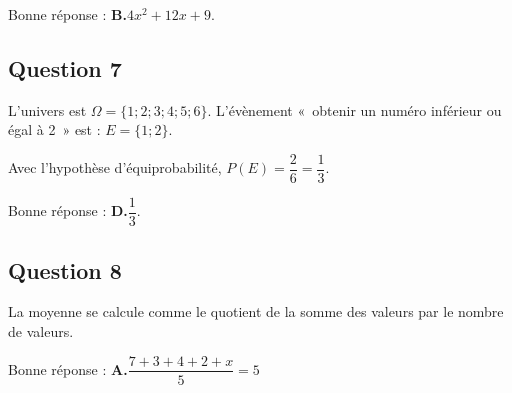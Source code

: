 \documentclass[10pt]{article}
\begin{document}
	Bonne réponse : \textbf{B.}\quad $4x^2+12x+9$.


\subsection*{Question 7}

L'univers est $\Omega = \lbrace 1 ; 2 ; 3 ; 4 ; 5 ; 6 \rbrace$. L'évènement «~obtenir un numéro inférieur ou égal à 2~» est : $E = \lbrace 1 ; 2  \rbrace$.

Avec l'hypothèse d'équiprobabilité, $P(E) = \dfrac{2}{6} = \dfrac{1}{3}$.

Bonne réponse : \textbf{D.}\quad $ \dfrac{1}{3} $.

\subsection*{Question 8}

La moyenne se calcule comme le quotient de la somme des valeurs par le nombre de valeurs.

Bonne réponse : \textbf{A.}\quad $\dfrac{7+3+4+2+x}{5}=5$

\end{document}
